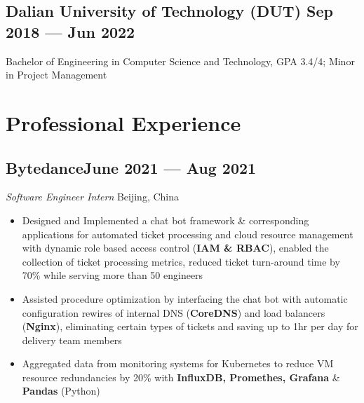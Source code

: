 \documentclass[a4,12pt]{article}
\newcommand{\subtext}[1]{
#1\par\vspace{-0.3cm}}
\newenvironment{zitemize}{
\begin{itemize}\itemsep0pt \parskip0pt \parsep1pt}
{\end{itemize}\vspace{-0.5cm}}
\begin{document}
\vspace{-0.4cm}
\subsection*{Dalian University of Technology (DUT) \hfill \textbf{Sep 2018 --- Jun 2022}}
Bachelor of Engineering in Computer Science and Technology, GPA 3.4/4; Minor in Project Management




\vspace{-0.5cm}


\section{\textbf{Professional Experience}}
        
\vspace{-0.15cm}


\subsection*{\normalsize\textbf{Bytedance}\hfill June 2021 --- Aug 2021} 
\subtext{\textit{Software Engineer Intern} \hfill Beijing, China} 
    \begin{zitemize}
        \item Designed and Implemented a chat bot framework \& corresponding applications for automated ticket processing and cloud resource management with dynamic role based access control (\textbf{IAM \& RBAC}), enabled the collection of ticket processing metrics, reduced ticket turn-around time by 70\% while serving more than 50 engineers
        \item Assisted procedure optimization by interfacing the chat bot with automatic configuration rewires of internal DNS (\textbf{CoreDNS}) and load balancers (\textbf{Nginx}), eliminating certain types of tickets and saving up to 1hr per day for delivery team members
        \item Aggregated data from monitoring systems for Kubernetes to reduce VM resource redundancies by 20\% with \textbf{InfluxDB, Promethes, Grafana} \& \textbf{Pandas} (Python)
    \end{zitemize}
\vspace{-0.1cm}
\end{document}

